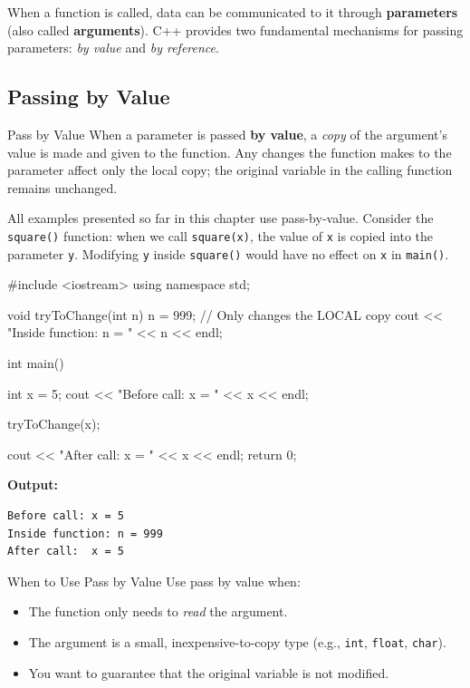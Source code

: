 When a function is called, data can be communicated to it through
\textbf{parameters} (also called \textbf{arguments}). C++ provides two
fundamental mechanisms for passing parameters: \emph{by value} and \emph{by
reference}.

\subsection{Passing by Value}
\label{subsec:pass-by-value}

\begin{definitionbox}{Pass by Value}
When a parameter is passed \textbf{by value}, a \emph{copy} of the argument's
value is made and given to the function. Any changes the function makes to the
parameter affect only the local copy; the original variable in the calling
function remains unchanged.
\end{definitionbox}

All examples presented so far in this chapter use pass-by-value. Consider the
\texttt{square()} function: when we call \texttt{square(x)}, the value of
\texttt{x} is copied into the parameter \texttt{y}. Modifying \texttt{y}
inside \texttt{square()} would have no effect on \texttt{x} in
\texttt{main()}.

\begin{cppcode}
#include <iostream>
using namespace std;

void tryToChange(int n)
{
    n = 999;   // Only changes the LOCAL copy
    cout << "Inside function: n = " << n << endl;
}

int main()
{
    int x = 5;
    cout << "Before call: x = " << x << endl;

    tryToChange(x);

    cout << "After call:  x = " << x << endl;
    return 0;
}
\end{cppcode}

\noindent\textbf{Output:}
\begin{verbatim}
Before call: x = 5
Inside function: n = 999
After call:  x = 5
\end{verbatim}

\begin{infobox}{When to Use Pass by Value}
Use pass by value when:
\begin{itemize}
    \item The function only needs to \emph{read} the argument.
    \item The argument is a small, inexpensive-to-copy type (e.g.,
          \texttt{int}, \texttt{float}, \texttt{char}).
    \item You want to guarantee that the original variable is not modified.
\end{itemize}
\end{infobox}

